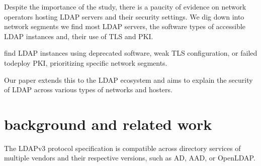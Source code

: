 Despite the importance of the study, there is a paucity of evidence on network operators hosting \gls{LDAP} servers and their security settings. We dig down into network segments we find most \gls{LDAP} servers, the software types of accessible \gls{LDAP} instances and, their use of \gls{TLS} and \gls{PKI}.


find \gls{LDAP} instances using deprecated software, weak TLS configuration, or failed todeploy \gls{PKI}, prioritizing specific network segments.

Our paper extends this to the \gls{LDAP} ecosystem and aims to explain the security of \gls{LDAP} across various types of networks and hosters. 






\section{background and related work}
The \gls{LDAP}v3 protocol specification is compatible across directory services of multiple vendors and their respective versions, such as \gls{AD}, \gls{AAD}, or OpenLDAP.



